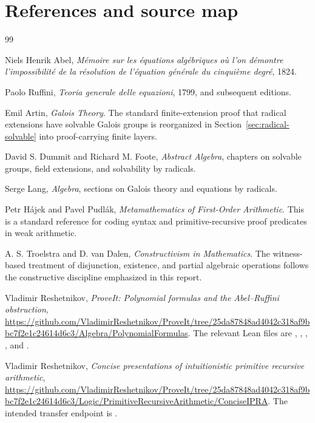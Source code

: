 \section{References and source map}
\label{sec:references}

\begin{thebibliography}{99}

Niels Henrik Abel,
\emph{Mémoire sur les équations algébriques où l'on démontre l'impossibilité
de la résolution de l'équation générale du cinquième degré}, 1824.

Paolo Ruffini,
\emph{Teoria generale delle equazioni}, 1799, and subsequent editions.

Emil Artin,
\emph{Galois Theory}.
The standard finite-extension proof that radical extensions have solvable
Galois groups is reorganized in Section~\ref{sec:radical-solvable} into
proof-carrying finite layers.

David S. Dummit and Richard M. Foote,
\emph{Abstract Algebra}, chapters on solvable groups, field extensions, and
solvability by radicals.

Serge Lang,
\emph{Algebra}, sections on Galois theory and equations by radicals.

Petr Hájek and Pavel Pudlák,
\emph{Metamathematics of First-Order Arithmetic}.
This is a standard reference for coding syntax and primitive-recursive proof
predicates in weak arithmetic.

A. S. Troelstra and D. van Dalen,
\emph{Constructivism in Mathematics}.
The witness-based treatment of disjunction, existence, and partial algebraic
operations follows the constructive discipline emphasized in this report.

Vladimir Reshetnikov,
\emph{ProveIt: Polynomial formulas and the Abel--Ruffini obstruction},
\url{https://github.com/VladimirReshetnikov/ProveIt/tree/25da87848ad4042c318af9bbc7f2e1c24614d6c3/Algebra/PolynomialFormulas}.
The relevant Lean files are , ,
, , and
.

Vladimir Reshetnikov,
\emph{Concise presentations of intuitionistic primitive recursive
arithmetic},
\url{https://github.com/VladimirReshetnikov/ProveIt/tree/25da87848ad4042c318af9bbc7f2e1c24614d6c3/Logic/PrimitiveRecursiveArithmetic/ConciseIPRA}.
The intended transfer endpoint is
.


\end{thebibliography}
